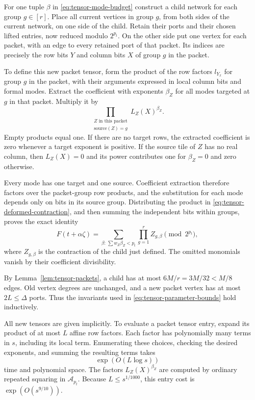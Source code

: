 For one tuple $\beta$ in \eqref{eq:tensor-mode-budget} construct
a child network for each group $g\in[r]$.
Place all current vertices in group $g$, from both sides of the
current network, on one side of the child.  Retain their ports and
their chosen lifted entries, now reduced modulo $2^{p_t}$.
On the other side put one vertex for each packet, with an edge
to every retained port of that packet.  Its indices are precisely
the row bits $Y$ and column bits $X$ of group $g$ in the packet.

To define this new packet tensor, form the product of the row
factors $l_{Y_x}$ for group $g$ in the packet, with their arguments
expressed in local column bits and formal modes.  Extract the
coefficient with exponents $\beta_Z$ for all modes targeted at
$g$ in that packet.  Multiply it by
\[
 \prod_{\substack{Z\text{ in this packet}\\
                  \text{source}(Z)=g}}L_Z(X)^{\beta_Z}.
\]
Empty products equal one. If there are no target rows, the extracted
coefficient is zero whenever a target exponent is positive. If the
source tile of $Z$ has no real column, then $L_Z(X)=0$ and its
power contributes one for $\beta_Z=0$ and zero otherwise.

Every mode has one target and one source.  Coefficient extraction
therefore factors over the packet-group row products, and the
substitution for each mode depends only on bits in its source
group.  Distributing the product in
\eqref{eq:tensor-deformed-contraction}, and then summing the
independent bits within groups, proves the exact identity
\begin{equation}\label{eq:tensor-recursion-identity}
 F(t+\alpha\zeta)
   =\sum_{\beta:\,\sum w_Z\beta_Z<p_t}
                       \prod_{g=1}^r Z_{g,\beta}
                  \pmod {2^{p_t}},
\end{equation}
where $Z_{g,\beta}$ is the contraction of the child just defined.
The omitted monomials vanish by their coefficient divisibility.

By Lemma~\ref{lem:tensor-packets}, a child has at most
$6M/r=3M/32<M/8$ edges.  Old vertex degrees are unchanged, and a
new packet vertex has at most $2L\le\Delta$ ports.  Thus the
invariants used in \eqref{eq:tensor-parameter-bounds} hold
inductively.

All new tensors are given implicitly.  To evaluate a packet
tensor entry, expand its product of at most $L$ affine row
factors.  Each factor has polynomially many terms in $s$,
including its local term.  Enumerating these choices, checking
the desired exponents, and summing the resulting terms takes
\[
 \exp(O(L\log s))
\]
time and polynomial space.  The factors $L_Z(X)^{\beta_Z}$ are
computed by ordinary repeated squaring in $\mathcal A_{p_t}$.
Because $L\le s^{1/1000}$, this entry cost is
$\exp(O(s^{9/10}))$.

